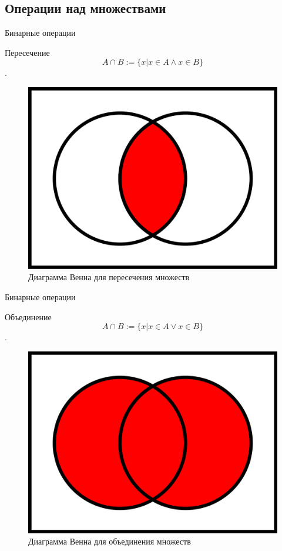 \documentclass{beamer}
\begin{document}
\subsection{Операции над множествами}
\begin{frame}{Бинарные операции}
\begin{block}{Пересечение}
\[A\cap B := \{ x|x \in A\wedge x \in B \}\].
\end{block}
\begin{figure}[h]
\centering
\includegraphics[scale=0.1]{images/intersect.png}
\caption{Диаграмма Венна для пересечения множеств}
\label{pic-intersect}
\end{figure}
\end{frame}

\begin{frame}{Бинарные операции}
\begin{block}{Объединение}
\[A\cap B := \{ x|x \in A \vee x \in B \}\].
\end{block}
\begin{figure}[h]
\centering
\includegraphics[scale=0.1]{images/union.png}
\caption{Диаграмма Венна для объединения множеств}
\label{pic-union}
\end{figure}
\end{frame}
\end{document}
